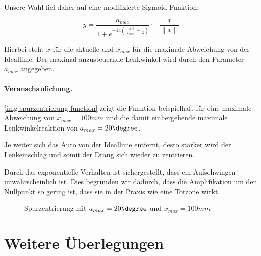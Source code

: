 \documentclass[a4paper,12pt]{report}
\begin{document}
	Unsere Wahl fiel daher auf eine modifizierte Sigmoid-Funktion:

		\[y=\frac{a_{max}}{1 + e^{-14\left( \frac{\left\|x\right\|}{x_{max}} - \frac{1}{2} \right)}} \cdot -\frac{x}{\left\|x\right\|}\]

	Hierbei steht $x$ für die aktuelle und $x_{max}$ für die maximale Abweichung von der Ideallinie.
	Der maximal anzusteuernde Lenkwinkel wird durch den Parameter $a_{max}$ angegeben.

	\paragraph{Veranschaulichung.} \autoref{img-spurzentrierung-function} zeigt die Funktion beispielhaft für eine maximale Abweichung von $x_{max} = 100mm$ und die damit einhergehende maximale Lenkwinkelreaktion von $a_{max} = 20\degree$.

	Je weiter sich das Auto von der Ideallinie entfernt, desto stärker wird der Lenkeinschlag und somit der Drang sich wieder zu zentrieren.

	Durch das exponentielle Verhalten ist sichergestellt, dass ein Aufschwingen unwahrscheinlich ist. Dies begründen wir dadurch, dass die Amplifikation um den Nullpunkt so gering ist, dass sie in der Praxis wie eine Totzone wirkt.

	\begin{figure}[ht]
		\centering


		\caption{Spurzentrierung mit $a_{max} = 20\degree$ und $x_{max} = 100mm$}
		\label{img-spurzentrierung-function}
	\end{figure}

\section{Weitere Überlegungen}
\end{document}
